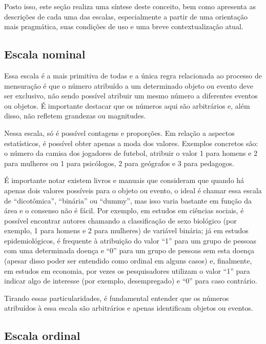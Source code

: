 \documentclass[
]{book}
\begin{document}
Posto isso, este seção realiza uma síntese deste conceito, bem como
apresenta as descrições de cada uma das escalas, especialmente a partir
de uma orientação mais pragmática, suas condições de uso e uma breve
contextualização atual.

\hypertarget{escala-nominal}{%
\subsection{Escala nominal}\label{escala-nominal}}

Essa escala é a mais primitiva de todas e a única regra relacionada ao
processo de mensuração é que o número atribuído a um determinado objeto
ou evento deve ser exclusivo, não sendo possível atribuir um mesmo
número a diferentes eventos ou objetos. É importante destacar que os
números aqui são arbitrários e, além disso, não refletem grandezas ou
magnitudes.

Nessa escala, só é possível contagens e proporções. Em relação a
aspectos estatísticos, é possível obter apenas a moda dos valores.
Exemplos concretos são: o número da camisa dos jogadores de futebol,
atribuir o valor 1 para homens e 2 para mulheres ou 1 para psicólogos, 2
para geógrafos e 3 para pedagogos.

É importante notar existem livros e manuais que consideram que quando há
apenas dois valores possíveis para o objeto ou evento, o ideal é chamar
essa escala de ``dicotômica'', ``binária'' ou ``dummy'', mas isso varia
bastante em função da área e o consenso não é fácil. Por exemplo, em
estudos em ciências sociais, é possível encontrar autores chamando a
classificação de sexo biológico (por exemplo, 1 para homens e 2 para
mulheres) de variável binária; já em estudos epidemiológicos, é
frequente à atribuição do valor ``1'' para um grupo de pessoas com uma
determinada doença e ``0'' para um grupo de pessoas sem esta doença
(apesar disso poder ser entendido como ordinal em alguns casos) e,
finalmente, em estudos em economia, por vezes os pesquisadores utilizam
o valor ``1'' para indicar algo de interesse (por exemplo, desempregado)
e ``0'' para caso contrário.

Tirando essas particularidades, é fundamental entender que os números
atribuídos à essa escala são arbitrários e apenas identificam objetos ou
eventos.

\hypertarget{escala-ordinal}{%
\subsection{Escala ordinal}\label{escala-ordinal}}
\end{document}
